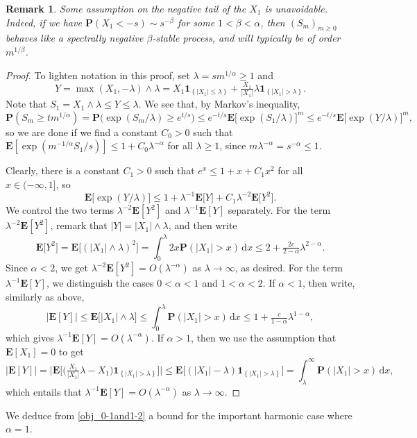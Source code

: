 \documentclass[11pt,reqno]{amsart}
\newtheorem*{rmk}{Remark}
\renewcommand{\P}{\mathbf{P}}
\newcommand{\1}{\mathbf{1}}
\newcommand{\0}{\mathbf{0}}
\newcommand{\dd}{\mathrm{d}}
\newcommand{\E}{{\mathbf E}}
\newcommand{\I}[1]{{\mathbf 1}_{\left\{#1\right\}}}
\begin{document}
\begin{rmk} Some assumption on the negative tail of the $X_1$ is unavoidable. Indeed, if we have $\P(X_1<-s) \sim s^{-\beta}$ for some $1<\beta<\alpha$, then $(S_m)_{m \geq 0}$ behaves like a spectrally negative $\beta$-stable process, and will typically be of order $m^{1/\beta}$.
\end{rmk}

\begin{proof}
To lighten notation in this proof, set $\lambda= sm^{1/\alpha}\geq 1$ and
\[Y=\max(X_1,-\lambda)\wedge \lambda=X_1\I{|X_1|\leq \lambda}+\tfrac{X_1}{|X_1|}\lambda\I{|X_1|>\lambda}.\]
Note that $S_1=X_1\wedge \lambda \leq Y\leq\lambda$. We see that, by Markov's inequality,
\[\P(S_m\ge tm^{1/\alpha}) = \P\big(\exp(S_m/\lambda)\ge e^{t/s}\big) \le e^{-t/s} \E\big[\exp(S_1/\lambda) \big]^m \le e^{-t/s} \E\big[\exp(Y/\lambda) \big]^m,\]
so we are done if we find a constant $C_0>0$ such that $\E[\exp(m^{-1/\alpha}S_1/s) ]\leq 1+ C_0 \lambda^{-\alpha}$ for all $\lambda\geq 1$, since $m\lambda^{-\alpha}=s^{-\alpha}\leq 1$.

Clearly, there is a constant $C_1>0$ such that $e^x\leq 1+x+C_1 x^2$ for all $x\in (-\infty,1]$, so
\[\E\big[\exp(Y/\lambda) \big]\leq 1 + \lambda^{-1}\E\big[Y\big]+ C_1\lambda^{-2}\E\big[Y^2\big].\]
We control the two terms $\lambda^{-2}\E[Y^2]$ and $\lambda^{-1}\E[Y]$ separately. For the term $\lambda^{-2}\E[Y^2]$, remark that $|Y|=|X_1|\wedge\lambda$, and then write
\[\E\big[Y^2\big]=\E\big[(|X_1|\wedge\lambda)^2\big]=\int_0^{\lambda}2x\P(|X_1|>x)\, \dd x\leq 2 +\tfrac{2c}{2-\alpha}\lambda^{2-\alpha}.\]
Since $\alpha<2$, we get $\lambda^{-2}\E[Y^2]=O(\lambda^{-\alpha})$ as $\lambda\to\infty$, as desired. For the term $\lambda^{-1}\E[Y]$, we distinguish the cases $0<\alpha<1$ and $1<\alpha<2$. If $\alpha<1$, then write, similarly as above, 
\[\big|\E[Y]\big|\leq \E\big[|X_1|\wedge\lambda\big]\leq \int_0^\lambda \P(|X_1|>x)\, \dd x\leq 1 +\tfrac{c}{1-\alpha}\lambda^{1-\alpha},\] which gives $\lambda^{-1}\E[Y]=O(\lambda^{-\alpha})$. If $\alpha>1$, then we use the assumption that $\E[X_1]=0$ to get
\[\big|\E[Y]\big|=\Big|\E\Big[\Big(\tfrac{X_1}{|X_1|}\lambda-X_1\Big)\I{|X_1|>\lambda}\Big]\Big| \leq \E\big[(|X_1|-\lambda)\I{|X_1|> \lambda}\big]=\int_\lambda^\infty \P(|X_1|>x) \,\dd x,\]
which entails that $\lambda^{-1}\E[Y]=O(\lambda^{-\alpha})$ as $\lambda\to\infty$.
\end{proof}

We deduce from \cref{obj_0-1and1-2} a bound for the important harmonic case where $\alpha=1$.
\end{document}
